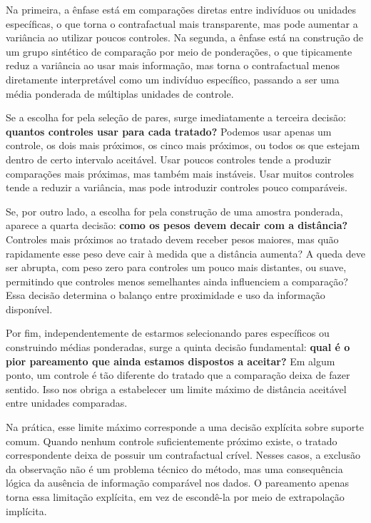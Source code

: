 Na primeira, a ênfase está em comparações diretas entre indivíduos ou unidades específicas, o que torna o contrafactual mais transparente, mas pode aumentar a variância ao utilizar poucos controles. Na segunda, a ênfase está na construção de um grupo sintético de comparação por meio de ponderações, o que tipicamente reduz a variância ao usar mais informação, mas torna o contrafactual menos diretamente interpretável como um indivíduo específico, passando a ser uma média ponderada de múltiplas unidades de controle.


Se a escolha for pela seleção de pares, surge imediatamente a terceira decisão: \textbf{quantos controles usar para cada tratado?} Podemos usar apenas um controle, os dois mais próximos, os cinco mais próximos, ou todos os que estejam dentro de certo intervalo aceitável. Usar poucos controles tende a produzir comparações mais próximas, mas também mais instáveis. Usar muitos controles tende a reduzir a variância, mas pode introduzir controles pouco comparáveis.

Se, por outro lado, a escolha for pela construção de uma amostra ponderada, aparece a quarta decisão: \textbf{como os pesos devem decair com a distância?} Controles mais próximos ao tratado devem receber pesos maiores, mas quão rapidamente esse peso deve cair à medida que a distância aumenta? A queda deve ser abrupta, com peso zero para controles um pouco mais distantes, ou suave, permitindo que controles menos semelhantes ainda influenciem a comparação? Essa decisão determina o balanço entre proximidade e uso da informação disponível.

Por fim, independentemente de estarmos selecionando pares específicos ou construindo médias ponderadas, surge a quinta decisão fundamental: \textbf{qual é o pior pareamento que ainda estamos dispostos a aceitar?} Em algum ponto, um controle é tão diferente do tratado que a comparação deixa de fazer sentido. Isso nos obriga a estabelecer um limite máximo de distância aceitável entre unidades comparadas.

Na prática, esse limite máximo corresponde a uma decisão explícita sobre suporte comum. Quando nenhum controle suficientemente próximo existe, o tratado correspondente deixa de possuir um contrafactual crível. Nesses casos, a exclusão da observação não é um problema técnico do método, mas uma consequência lógica da ausência de informação comparável nos dados. O pareamento apenas torna essa limitação explícita, em vez de escondê-la por meio de extrapolação implícita.


